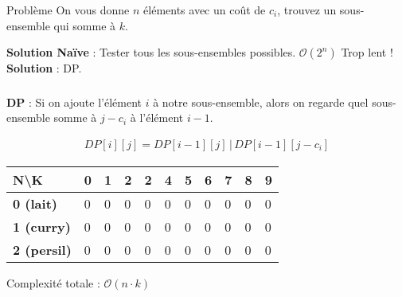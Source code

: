 
\begin{frame}
    \frametitle{\problemtitle}
    \begin{block}
        {Problème} On vous donne $n$ éléments avec un coût de $c_i$, trouvez un sous-ensemble qui somme à $k$.
    \end{block}
    \pause
    \textbf{Solution Naïve} : Tester tous les sous-ensembles possibles. $\mathcal{O}(2^n)$ Trop lent ! \\
    \pause
    \textbf{Solution} : DP. \\
    \pause
\end{frame}
\begin{frame}
    \frametitle{\problemtitle}
    \textbf{DP} : Si on ajoute l'élément $i$ à notre sous-ensemble, alors on regarde quel sous-ensemble somme à $j-c_i$ à l'élément $i-1$.
    
    \begin{align*}
        DP[i][j] = DP[i-1][j] \,|\, DP[i-1][j-c_i]
    \end{align*}
    
    \begin{table}[]
      \begin{tabular}{|l|l|l|l|l|l|l|l|l|l|l|}
      \hline
      \textbf{N\textbackslash{}K} & \textbf{0} & \textbf{1} & \textbf{2} & \textbf{2} & \textbf{4} & \textbf{5} & \textbf{6} & \textbf{7} & \textbf{8} & \textbf{9} \\ \hline
      \textbf{0 (lait)}   & 0 & 0 & 0 & 0 & 0 & 0 & 0 & 0 & 0 & 0 \\ \hline
      \textbf{1 (curry)}  & 0 & 0 & 0 & 0 & 0 & 0 & 0 & 0 & 0 & 0 \\ \hline
      \textbf{2 (persil)} & 0 & 0 & 0 & 0 & 0 & 0 & 0 & 0 & 0 & 0 \\ \hline
      \end{tabular}
    \end{table}
    
    Complexité totale : $\mathcal{O}(n \cdot k)$
\end{frame}

